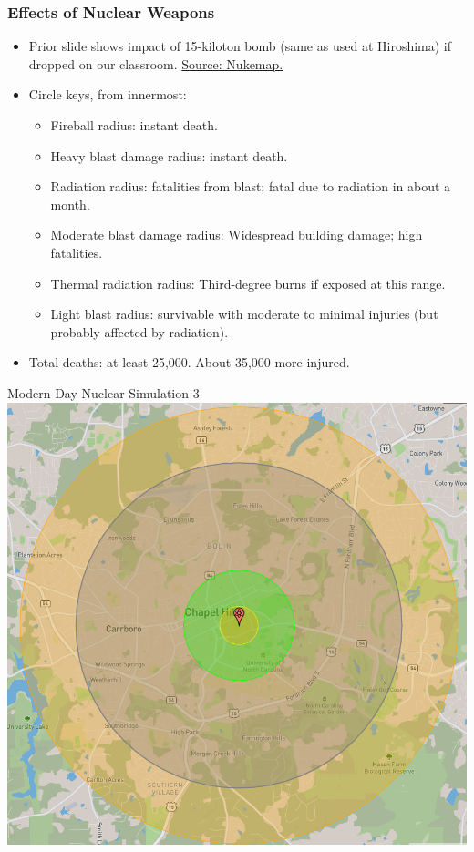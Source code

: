 \documentclass[handout]{beamer}
\begin{document}
\begin{frame} 
	\frametitle{\LARGE{Effects of Nuclear Weapons}}
	\begin{itemize}
		\item Prior slide shows impact of 15-kiloton bomb (same as used at Hiroshima) if dropped on our classroom. \href{https://nuclearsecrecy.com/nukemap/}{Source: Nukemap.} 
		\item Circle keys, from innermost: 	
		\begin{itemize}
			\item Fireball radius: instant death.
			\item Heavy blast damage radius: instant death.
			\item Radiation radius: fatalities from blast; fatal due to radiation in about a month.
			\item Moderate blast damage radius: Widespread building damage; high fatalities.
			\item Thermal radiation radius: Third-degree burns if exposed at this range.
			\item Light blast radius: survivable with moderate to minimal injuries (but probably affected by radiation).
		\end{itemize}
		\item Total deaths: at least 25,000. About 35,000 more injured.	
	\end{itemize}
\end{frame}

\begin{frame}{\LARGE Modern-Day Nuclear Simulation 3}
	\centering
	\includegraphics[width=\textwidth,height=0.9\textheight,keepaspectratio]{UNCnuke2.png}
\end{frame}
\end{document}

